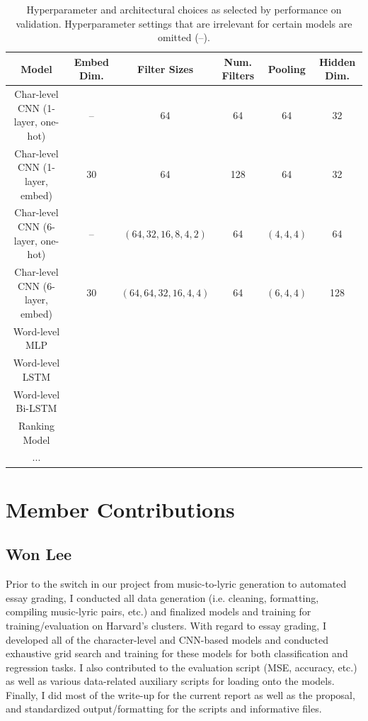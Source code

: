\documentclass[10pt,psamsfonts]{amsart}
\theoremstyle{definition}
\theoremstyle{remark}
\numberwithin{equation}{section}
\begin{document}
\begin{table}
	\begin{tabular}{c|c|c|c|c|c}
		Model & Embed Dim. & Filter Sizes & Num. Filters & Pooling & Hidden Dim. \\\hline
		Char-level CNN (1-layer, one-hot) & -- & 64 & 64 & 64 & 32 \\
		Char-level CNN (1-layer, embed) &  30 & 64 & 128 & 64 & 32 \\
		Char-level CNN (6-layer, one-hot) & -- & $(64, 32, 16, 8, 4, 2)$ & 64 & $(4,4,4)$ & 64 \\
		Char-level CNN (6-layer, embed) & 30 & $(64, 64, 32, 16, 4, 4)$ & 64 & $(6,4,4)$ & 128 \\
		Word-level MLP  & & & & & \\
		Word-level LSTM  & & & & & \\
		Word-level Bi-LSTM  & & & & & \\
		Ranking Model & & & & & \\
		...  & & & & &
	\end{tabular}
	\caption{Hyperparameter and architectural choices as selected by performance on validation. Hyperparameter settings that are irrelevant for certain models are omitted (--).}
	\label{fig:params}
\end{table}


\section*{Member Contributions}

\subsection*{Won Lee}

Prior to the switch in our project from music-to-lyric generation to automated essay grading, I conducted all data generation (i.e. cleaning, formatting, compiling music-lyric pairs, etc.) and finalized models and training for training/evaluation on Harvard's clusters. With regard to essay grading, I developed all of the character-level and CNN-based models and conducted exhaustive grid search and training for these models for both classification and regression tasks. I also contributed to the evaluation script (MSE, accuracy, etc.) as well as various data-related auxiliary scripts for loading onto the models. Finally, I did most of the write-up for the current report as well as the proposal, and standardized output/formatting for the scripts and informative files.
\end{document}
